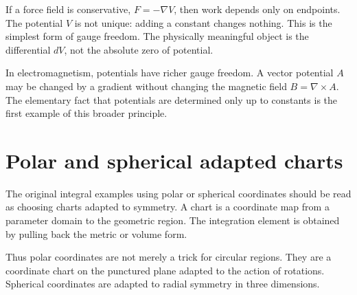If a force field is conservative, $F=-\nabla V$, then work depends only on endpoints.  The potential $V$ is not unique: adding a constant changes nothing.  This is the simplest form of gauge freedom.  The physically meaningful object is the differential $dV$, not the absolute zero of potential.

In electromagnetism, potentials have richer gauge freedom.  A vector potential $A$ may be changed by a gradient without changing the magnetic field $B=\nabla\times A$.  The elementary fact that potentials are determined only up to constants is the first example of this broader principle.

\section{Polar and spherical adapted charts}

The original integral examples using polar or spherical coordinates should be read as choosing charts adapted to symmetry.  A chart is a coordinate map from a parameter domain to the geometric region.  The integration element is obtained by pulling back the metric or volume form.

Thus polar coordinates are not merely a trick for circular regions.  They are a coordinate chart on the punctured plane adapted to the action of rotations.  Spherical coordinates are adapted to radial symmetry in three dimensions.
